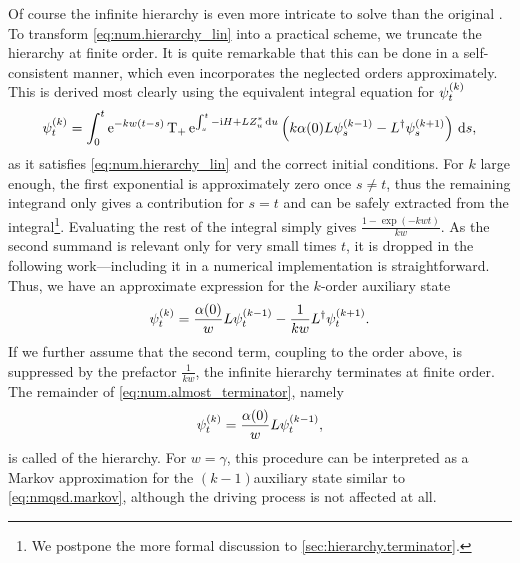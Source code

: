 Of course the infinite hierarchy is even more intricate to solve than the original \NMSSE\@.
To transform \autoref{eq:num.hierarchy_lin} into a practical scheme, we truncate the hierarchy at finite order.
It is quite remarkable that this can be done in a self-consistent manner, which even incorporates the neglected orders approximately.
This is derived most clearly using the equivalent integral equation for $\psit[k]$
\begin{equation}
  \psit[k] = \int_0^t \exp[-kw(t-s)] \Texp[\int_s^t -\ii\Hsys + L\ZZ_u \dd u] \left( k \alpha(0)L\psi_s^{(k-1)} - \adj{L} \psi_s^{(k+1)} \right) \dd s,
  \label{eq:num.terminator_integral}
\end{equation}
as it satisfies \autoref{eq:num.hierarchy_lin} and the correct initial conditions.
For $k$ large enough, the first exponential is approximately zero once $s \neq t$, thus the remaining integrand only gives a contribution for $s = t$ and can be safely extracted from the integral\footnote{%
  We postpone the more formal discussion to \autoref{sec:hierarchy.terminator}.
}.
Evaluating the rest of the integral simply gives $\frac{1 - \exp(-kwt)}{kw}$.
As the second summand is relevant only for very small times $t$, it is dropped in the following work---including it in a numerical implementation is straightforward.
Thus, we have an approximate expression for the $k$\th-order auxiliary state
\begin{equation}
  \psit[k] = \frac{\alpha(0)}{w} L\psit[k-1] - \frac{1}{kw} \adj{L} \psit[k+1].
  \label{eq:num.almost_terminator}
\end{equation}
If we further assume that the second term, coupling to the order above, is suppressed by the prefactor $\frac{1}{kw}$, the infinite hierarchy terminates at finite order.
The remainder of \autoref{eq:num.almost_terminator}, namely
\begin{equation}
  \psit[k] = \frac{\alpha(0)}{w} L \psit[k-1],
  \label{eq:num.terminator}
\end{equation}
is called  of the hierarchy.
For $w = \gamma$, this procedure can be interpreted as a Markov approximation for the $(k-1)$\th auxiliary state similar to \autoref{eq:nmqsd.markov}, although the driving process is not affected at all.



